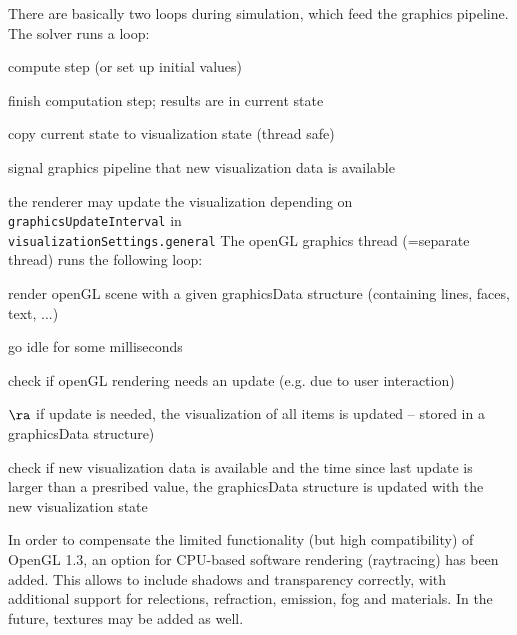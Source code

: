 There are basically two loops during simulation, which feed the graphics pipeline.
The solver runs a loop:
\bi
  \item compute step (or set up initial values)
  \item finish computation step; results are in current state
  \item copy current state to visualization state (thread safe)
  \item signal graphics pipeline that new visualization data is available
  \item the renderer may update the visualization depending on \texttt{graphicsUpdateInterval} in \\ \texttt{visualizationSettings.general}
\ei
The openGL graphics thread (=separate thread) runs the following loop:
\bi
  \item render openGL scene with a given graphicsData structure (containing lines, faces, text, ...)
  \item go idle for some milliseconds
  \item check if openGL rendering needs an update (e.g. due to user interaction)
  \item[] $\ra$ if update is needed, the visualization of all items is updated -- stored in a graphicsData structure)
  \item check if new visualization data is available and the time since last update is larger than a presribed value, the graphicsData structure is updated with the new visualization state
\ei

In order to compensate the limited functionality (but high compatibility) of OpenGL 1.3, an option for CPU-based software rendering (raytracing) has been added.
This allows to include shadows and transparency correctly, with additional support for relections, refraction, emission, fog and materials.
In the future, textures may be added as well.


